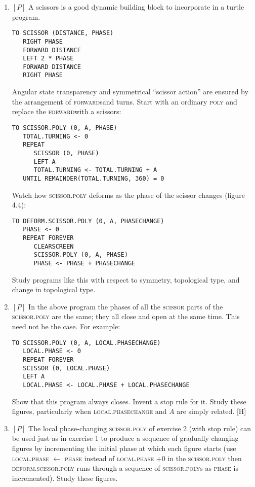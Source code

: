 \documentclass{book}
\begin{document}
\begin{enumerate}
\item $[P]$ A scissors is a good dynamic building block to incorporate in a
turtle program.
\begin{verbatim}
TO SCISSOR (DISTANCE, PHASE)
   RIGHT PHASE
   FORWARD DISTANCE
   LEFT 2 * PHASE
   FORWARD DISTANCE
   RIGHT PHASE
\end{verbatim}
Angular state transparency and symmetrical ``scissor action'' are ensured
by the arrangement of \textsc{forward}sand turns. Start with an ordinary \textsc{poly}
and replace the \textsc{forward}with a scissors:

\begin{verbatim}
TO SCISSOR.POLY (0, A, PHASE)
   TOTAL.TURNING <- 0
   REPEAT
      SCISSOR (0, PHASE)
      LEFT A
      TOTAL.TURNING <- TOTAL.TURNING + A
   UNTIL REMAINDER(TOTAL.TURNING, 360) = 0
\end{verbatim}
Watch how \textsc{scissor}\textsc{.poly} deforms as the phase of the scissor changes
(figure 4.4):

\begin{verbatim}
TO DEFORM.SCISSOR.POLY (0, A, PHASECHANGE)
   PHASE <- 0
   REPEAT FOREVER
      CLEARSCREEN
      SCISSOR.POLY (0, A, PHASE)
      PHASE <- PHASE + PHASECHANGE
\end{verbatim}
Study programs like this with respect to symmetry, topological type,
and change in topological type.
\item $[P]$ In the above program the phases of all the \textsc{scissor} parts of the
\textsc{scissor}\textsc{.poly} are the same; they all close and open at the same time.
This need not be the case. For example:

\begin{verbatim}
TO SCISSOR.POLY (0, A, LOCAL.PHASECHANGE)
   LOCAL.PHASE <- 0
   REPEAT FOREVER
   SCISSOR (0, LOCAL.PHASE)
   LEFT A
   LOCAL.PHASE <- LOCAL.PHASE + LOCAL.PHASECHANGE
\end{verbatim}
Show that this program always closes. Invent a stop rule for it. Study
these figures, particularly when \textsc{local}\textsc{.phasechange} and $A$ are simply
related. [H]
\item $[P]$ The local phase-changing \textsc{scissor}\textsc{.poly} of exercise 2 (with stop
rule) can be used just as in exercise 1 to produce a sequence of gradually
changing figures by incrementing the initial phase at which each figure
starts (use \textsc{local}\textsc{.phase} $\leftarrow$ \textsc{phase} instead of \textsc{local}\textsc{.phase} $+ 0$ in the
\textsc{scissor}\textsc{.poly} then \textsc{deform}\textsc{.scissor}\textsc{.poly} runs through a sequence of
\textsc{scissor}\textsc{.poly}s as \textsc{phase} is incremented). Study these figures.


\end{enumerate}
\end{document}
